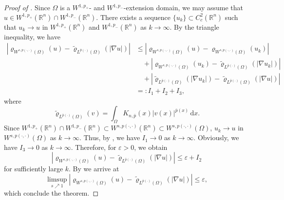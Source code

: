 \documentclass[11pt]{amsart}
\theoremstyle{plain}
\theoremstyle{definition}
\numberwithin{equation}{section}
\begin{document}
\begin{proof} [Proof of ]
Since $\Omega$ is a $W^{1, p_{+}}$- and $W^{1, p_{-}}$-extension domain, we may assume that $u \in W^{1, p_{+}}(\mathbb{R}^{n}) \cap W^{1, p_{-}}(\mathbb{R}^{n})$. There exists a sequence $\lbrace u_{k} \rbrace \subset C^{2}_{c}(\mathbb{R}^{n})$ such that $u_{k} \to u$ in $W^{1, p_{+}}(\mathbb{R}^{n})$ and $W^{1, p_{-}}(\mathbb{R}^{n})$ as $k \to \infty$. By the triangle inequality, we have
\begin{equation*}
\begin{split}
\left| \varrho_{W^{s, p(\cdot, \cdot)}(\Omega)}(u) - \tilde{\varrho}_{L^{\bar{p}(\cdot)}(\Omega)}(|\nabla u|) \right|
&\leq \left| \varrho_{W^{s, p(\cdot, \cdot)}(\Omega)}(u) - \varrho_{W^{s, p(\cdot, \cdot)}(\Omega)}(u_{k}) \right| \\
&\quad + \left| \varrho_{W^{s, p(\cdot, \cdot)}(\Omega)}(u_{k}) - \tilde{\varrho}_{L^{\bar{p}(\cdot)}(\Omega)}(|\nabla u_{k}|) \right| \\
&\quad + \left| \tilde{\varrho}_{L^{\bar{p}(\cdot)}(\Omega)}(|\nabla u_{k}|) - \tilde{\varrho}_{L^{\bar{p}(\cdot)}(\Omega)}(|\nabla u|) \right| \\
&=: I_{1} + I_{2} + I_{3},
\end{split}
\end{equation*}
where
\begin{equation*}
\tilde{\varrho}_{L^{\bar{p}(\cdot)}(\Omega)}(v) = \int_{\Omega} K_{n, \bar{p}}(x) |v(x)|^{\bar{p}(x)} \,\mathrm{d}x.
\end{equation*}
Since $W^{1, p_{+}}(\mathbb{R}^{n}) \cap W^{1, p_{-}}(\mathbb{R}^{n}) \subset W^{s, p(\cdot, \cdot)}(\mathbb{R}^{n}) \subset W^{s, p(\cdot, \cdot)}(\Omega)$, $u_{k} \to u$ in $W^{s, p(\cdot, \cdot)}(\Omega)$ as $k \to \infty$. Thus, by , we have $I_{1} \to 0$ as $k \to \infty$. Obviously, we have $I_{3} \to 0$ as $k \to \infty$. Therefore, for $\varepsilon > 0$, we obtain
\begin{equation*}
\left| \varrho_{W^{s, p(\cdot, \cdot)}(\Omega)}(u) - \tilde{\varrho}_{L^{\bar{p}(\cdot)}(\Omega)}(|\nabla u|) \right| \leq \varepsilon + I_{2}
\end{equation*}
for sufficiently large $k$. By  we arrive at
\begin{equation*}
\limsup_{s \nearrow 1} \left| \varrho_{W^{s, p(\cdot, \cdot)}(\Omega)}(u) - \tilde{\varrho}_{L^{\bar{p}(\cdot)}(\Omega)}(|\nabla u|) \right| \leq \varepsilon,
\end{equation*}
which conclude the theorem.
\end{proof}
\end{document}
